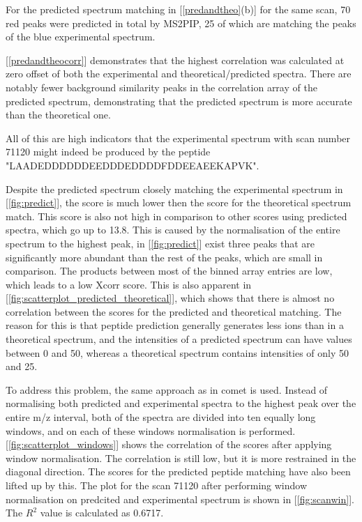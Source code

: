 \documentclass[11pt]{article}
\begin{document}
For the predicted spectrum matching in [\cref{predandtheo}(b)] for the same scan, 70 red peaks were predicted in total by MS2PIP, 25 of which are matching the peaks of the blue experimental spectrum.

[\cref{predandtheocorr}] demonstrates that the highest correlation was calculated at zero offset of both the experimental and theoretical/predicted spectra. There are notably fewer background similarity peaks in the correlation array of the predicted spectrum, demonstrating that the predicted spectrum is more accurate than the theoretical one.

All of this are high indicators that the experimental spectrum with scan number 71120 might indeed be produced by the peptide "LAADEDDDDDDEEDDDEDDDDFDDEEAEEKAPVK".

Despite the predicted spectrum closely matching the experimental spectrum in [\cref{fig:predict}], the score is much lower then the score for the theoretical spectrum match. This score is also not high in comparison to other scores using predicted spectra, which go up to 13.8. This is caused by the normalisation of the entire spectrum to the highest peak, in [\cref{fig:predict}] exist three peaks that are significantly more abundant than the rest of the peaks, which are small in comparison. The products between most of the binned array entries are low, which leads to a low Xcorr score. This is also apparent in [\cref{fig:scatterplot_predicted_theoretical}], which shows that there is almost no correlation between the scores for the predicted and theoretical matching. The reason for this is that peptide prediction generally generates less ions than in a theoretical spectrum, and the intensities of a predicted spectrum can have values between 0 and 50, whereas a theoretical spectrum contains intensities of only 50 and 25.

To address this problem, the same approach as in comet is used. Instead of normalising both predicted and experimental spectra to the highest peak over the entire m/z interval, both of the spectra are divided into ten equally long windows, and on each of these windows normalisation is performed. [\cref{fig:scatterplot_windows}] shows the correlation of the scores after applying window normalisation. The correlation is still low, but it is more restrained in the diagonal direction. The scores for the predicted peptide matching have also been lifted up by this. The plot for the scan 71120 after performing window normalisation on predcited and experimental spectrum is shown in [\cref{fig:scanwin}]. The \(R^2\) value is calculated as 0.6717.
\end{document}
